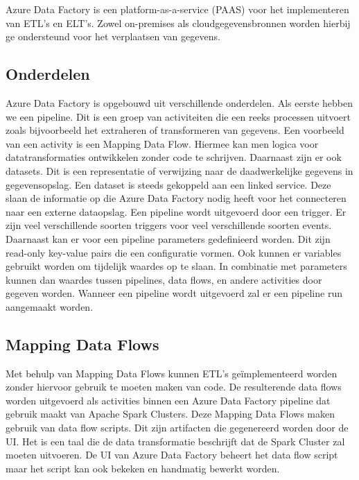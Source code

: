 Azure Data Factory is een platform-as-a-service (PAAS) voor het implementeren van ETL's en ELT's. Zowel on-premises als cloudgegevensbronnen worden hierbij ge ondersteund voor het verplaatsen van gegevens.~\autocite{Rawat2019} 

\subsection{Onderdelen}

Azure Data Factory is opgebouwd uit verschillende onderdelen. Als eerste hebben we een pipeline. Dit is een groep van activiteiten die een reeks processen uitvoert zoals bijvoorbeeld het extraheren of transformeren van gegevens. Een voorbeeld van een activity is een Mapping Data Flow. Hiermee kan men logica voor datatransformaties ontwikkelen zonder code te schrijven. Daarnaast zijn er ook datasets. Dit is een representatie of verwijzing naar de daadwerkelijke gegevens in gegevensopslag. Een dataset is steeds gekoppeld aan een linked service. Deze slaan de informatie op die Azure Data Factory nodig heeft voor het connecteren naar een externe dataopslag. Een pipeline wordt uitgevoerd door een trigger. Er zijn veel verschillende soorten triggers voor veel verschillende soorten events. Daarnaast kan er voor een pipeline parameters gedefinieerd worden. Dit zijn read-only key-value pairs die een configuratie vormen. Ook kunnen er variables gebruikt worden om tijdelijk waardes op te slaan. In combinatie met parameters kunnen dan waardes tussen pipelines, data flows, en andere activities door gegeven worden. Wanneer een pipeline wordt uitgevoerd zal er een pipeline run aangemaakt worden.~\autocite{Microsoft2024a} 

\subsection{Mapping Data Flows}

Met behulp van Mapping Data Flows kunnen ETL's geïmplementeerd worden zonder hiervoor gebruik te moeten maken van code. De resulterende data flows worden uitgevoerd als activities binnen een Azure Data Factory pipeline dat gebruik maakt van Apache Spark Clusters. Deze Mapping Data Flows maken gebruik van data flow scripts. Dit zijn artifacten die gegenereerd worden door de UI. Het is een taal die de data transformatie beschrijft dat de Spark Cluster zal moeten uitvoeren. De UI van Azure Data Factory beheert het data flow script maar het script kan ook bekeken en handmatig bewerkt worden.~\autocite{Kromer2022a}

